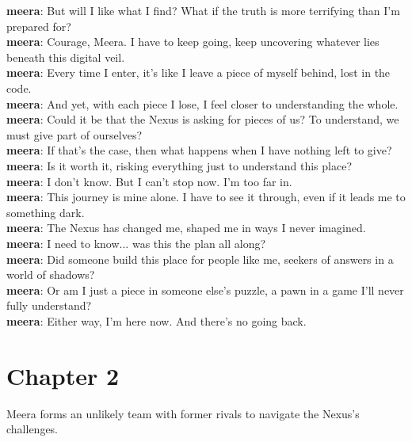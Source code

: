 \documentclass[12pt]{book}
\begin{document}
\textbf{meera}: But will I like what I find? What if the truth is more terrifying than I'm prepared for?\\

\textbf{meera}: Courage, Meera. I have to keep going, keep uncovering whatever lies beneath this digital veil.\\

\textbf{meera}: Every time I enter, it's like I leave a piece of myself behind, lost in the code.\\

\textbf{meera}: And yet, with each piece I lose, I feel closer to understanding the whole.\\

\textbf{meera}: Could it be that the Nexus is asking for pieces of us? To understand, we must give part of ourselves?\\

\textbf{meera}: If that's the case, then what happens when I have nothing left to give?\\

\textbf{meera}: Is it worth it, risking everything just to understand this place?\\

\textbf{meera}: I don't know. But I can't stop now. I'm too far in.\\

\textbf{meera}: This journey is mine alone. I have to see it through, even if it leads me to something dark.\\

\textbf{meera}: The Nexus has changed me, shaped me in ways I never imagined.\\

\textbf{meera}: I need to know... was this the plan all along?\\

\textbf{meera}: Did someone build this place for people like me, seekers of answers in a world of shadows?\\

\textbf{meera}: Or am I just a piece in someone else's puzzle, a pawn in a game I'll never fully understand?\\

\textbf{meera}: Either way, I'm here now. And there's no going back.\\

\vspace{1em}

\chapter*{Chapter 2}
Meera forms an unlikely team with former rivals to navigate the Nexus's challenges.
\end{document}
